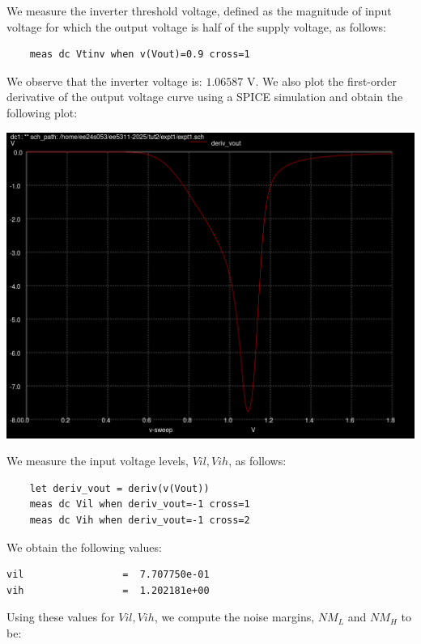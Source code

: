 \documentclass[10pt,letter]{article}
\begin{document}
We measure the inverter threshold voltage, defined as the magnitude of input voltage for which the output voltage is half of the supply voltage, as follows:

\begin{verbatim}
    meas dc Vtinv when v(Vout)=0.9 cross=1
\end{verbatim}

We observe that the inverter voltage is: $1.06587$ V.\newline
We also plot the first-order derivative of the output voltage curve using a SPICE simulation and obtain the following plot:

\begin{center}
\includegraphics[scale=0.3]{tut2/reports/media/expt1_deriv_vout.png}
\end{center}

We measure the input voltage levels, $Vil, Vih$, as follows:

\begin{verbatim}
    let deriv_vout = deriv(v(Vout))
    meas dc Vil when deriv_vout=-1 cross=1
    meas dc Vih when deriv_vout=-1 cross=2
\end{verbatim}

We obtain the following values:

\begin{verbatim}
vil                 =  7.707750e-01
vih                 =  1.202181e+00
\end{verbatim}

Using these values for $Vil, Vih$, we compute the noise margins, $NM_{L}$ and $NM_{H}$ to be:
\end{document}
